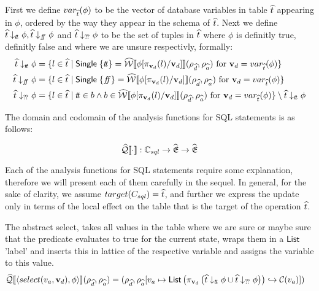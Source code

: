 First we define $var_{\widehat{t}}(\phi)$ to be the vector of database variables in table $\widehat{t}$ appearing in $\phi$, ordered by the way they appear in the schema of $\widehat{t}$.
Next we define $\widehat{t} \downarrow_{t\!t} \phi, \widehat{t} \downarrow_{f\!\!f} \phi$ and  $\widehat{t} \downarrow_{?\!?} \phi$ to be the set of tuples in $\widehat{t}$ where $\phi$ is definitly true, definitly false and where we are unsure respectivly, formally:
\begin{align}
    \abstable \downarrow_{\true} \phi &= \{ l \in \ab{t} \mid \mathsf{Single} \; \{ \true \} = \abspredsem{\phi[\pi_{\mathbf{v}_d}(l)/\mathbf{v}_d]}(\rho_{\ab{d}}, \rho_{\ab{a}}) \text{ for } \mathbf{v}_d = var_{\ab{t}}(\phi) \} \\
    \abstable \downarrow_{\false} \phi &= \{ l \in \ab{t} \mid \mathsf{Single} \; \{ \false \} = \abspredsem{\phi[\pi_{\mathbf{v}_d}(l)/\mathbf{v}_d]}(\rho_{\ab{d}}, \rho_{\ab{a}}) \text{ for } \mathbf{v}_d = var_{\ab{t}}(\phi) \} \\
    \abstable \downarrow_{\unknown} \phi &= \{ l \in \ab{t} \mid \true \in b \land b \in \abspredsem{\phi[\pi_{\mathbf{v}_d}(l)/\mathbf{v}_d]}(\rho_{\ab{d}}, \rho_{\ab{a}}) \text{ for } \mathbf{v}_d = var_{\ab{t}}(\phi) \} \setminus \abstable \downarrow_{\true} \phi
\end{align}

The domain and codomain of the analysis functions for SQL statements is as follows:

\begin{equation}
    \widehat{\mathcal{Q}}\llbracket \cdot \rrbracket : \mathbb{C}_{sql} \rightarrow \widehat{\mathfrak{E}} \rightarrow \widehat{\mathfrak{E}}
\end{equation}

Each of the analysis functions for SQL statements require some explanation, therefore we will present each of them carefully in the sequel.
In general, for the sake of clarity, we assume $target(C_{sql}) = \widehat{t}$, and further we express the update only in terms of the local effect on the table that is the target of the operation $\widehat{t}$.

The abstract select, takes all values in the table where we are sure or maybe sure that the predicate evaluates to true for the current state, wraps them in a $\mathsf{List}$ 'label' and inserts this in lattice of the respective variable and assigns the variable to this value.
\begin{align}
    \widehat{\mathcal{Q}}\llbracket \langle select(v_a, \mathbf{v}_d), \phi \rangle \rrbracket(\rho_{\widehat{d}}, \rho_{\widehat{a}})
    &= (\rho_{\widehat{d}}, \rho_{\widehat{a}}[v_a \mapsto \mathsf{List} \left( \pi_{\mathbf{v}_d} \left(\widehat{t} \downarrow_{t\!t} \phi \cup \widehat{t} \downarrow_{?\!?} \phi \right) \right) \hookrightarrow \mathcal{C}(v_a) ])
\end{align}

